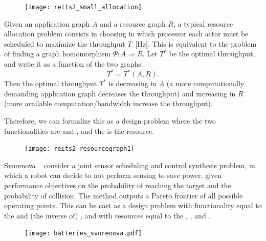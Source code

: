 \begin{figure}
\texttt{[image: reits2\_small\_allocation]}\end{figure}

Given an application graph $A$ and a resource graph $R$, a typical
resource allocation problem consists in choosing in which processor
each actor must be scheduled to maximize the throughput $T$~[Hz].
This is equivalent to the problem of finding a graph homomorphism $\Psi:A \Rightarrow R$.
Let $T^{\ast}$ be the optimal throughput, and write it as a function
of the two graphs:
\[
T^{\ast}=T^{\ast}(A,R).
\]
Then the optimal throughput $T^{*}$ is decreasing in $A$ (a more
computationally demanding application graph decreases the throughput)
and increasing in $R$ (more available computation/bandwidth increase
the throughput).

Therefore, we can formalize this as a design problem where the two
functionalities are  and , and the  is the
resource.

\begin{figure}

\texttt{[image: reits2\_resourcegraph1]}

\caption{}
\end{figure}



\begin{example}
Svorenova\,\,\etal~\cite{svorenova16resource} consider a joint
sensor scheduling and control synthesis problem, in which a robot
can decide to not perform sensing to save power, given performance
objectives on the probability of reaching the target and the probability
of collision. The method outputs a Pareto frontier of all possible
operating points. This can be cast as a design problem with functionality
equal to the  and (the inverse
of) , and with resources equal to the
, , and .
    
\end{example}

\begin{figure}[h]
    \centering
    \texttt{[image: batteries\_svorenova.pdf]}
    \caption{\label{fig:progressive-1-1}}
\end{figure}


